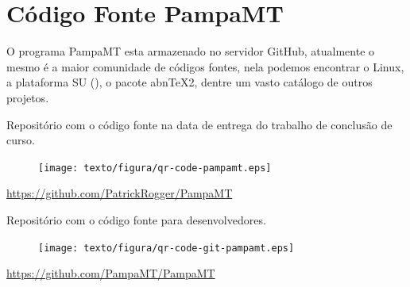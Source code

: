 \chapter{Código Fonte PampaMT}

    \vspace*{1cm} 
    
    O programa PampaMT esta armazenado no servidor GitHub, atualmente o mesmo é a maior comunidade de códigos fontes, nela podemos encontrar o  Linux, a plataforma SU (), o pacote abn\TeX2, dentre um vasto catálogo de outros projetos.   
    
    \vspace*{1cm}
    
    \begin{center}
    Repositório com o código fonte na data de entrega do trabalho de conclusão de curso.
    \end{center}
    
    \begin{figure}[h]
        \begin{center}
            \texttt{[image: texto/figura/qr-code-pampamt.eps]}
        \end{center}
    \end{figure}
    \begin{center}
        \url{https://github.com/PatrickRogger/PampaMT}
    \end{center}
    
    \begin{center}
    Repositório com o código fonte para desenvolvedores.
    \end{center}
    
    \begin{figure}[h]
        \begin{center}
            \texttt{[image: texto/figura/qr-code-git-pampamt.eps]}
        \end{center}
    \end{figure}
    \begin{center}
        \url{https://github.com/PampaMT/PampaMT}
    \end{center}

    \vfill
